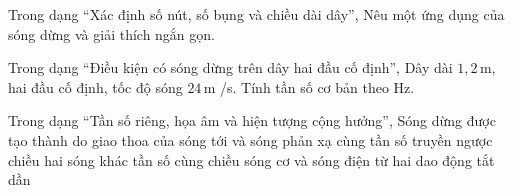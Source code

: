 \begin{ex}
Trong dạng “Xác định số nút, số bụng và chiều dài dây”, Nêu một ứng dụng của sóng dừng và giải thích ngắn gọn.
\choiceTF

\end{ex}

\begin{ex}
Trong dạng “Điều kiện có sóng dừng trên dây hai đầu cố định”, Dây dài $1,2\,\text{m}$, hai đầu cố định, tốc độ sóng $24\,\text{m}$ /s. Tính tần số cơ bản theo Hz.
\end{ex}

\begin{ex}
Trong dạng “Tần số riêng, họa âm và hiện tượng cộng hưởng”, Sóng dừng được tạo thành do giao thoa của
\choice
{\True sóng tới và sóng phản xạ cùng tần số truyền ngược chiều}
{hai sóng khác tần số cùng chiều}
{sóng cơ và sóng điện từ}
{hai dao động tắt dần}
\end{ex}

